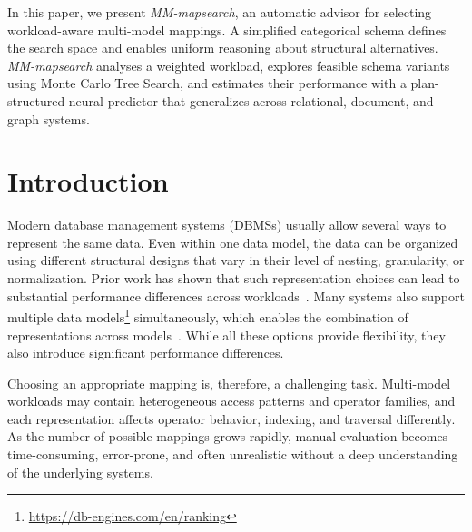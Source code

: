 In this paper, we present \textit{MM-mapsearch}, an automatic advisor for selecting workload-aware multi-model mappings. A simplified categorical schema defines the search space and enables uniform reasoning about structural alternatives. \textit{MM-mapsearch} analyses a weighted workload, explores feasible schema variants using Monte Carlo Tree Search, and estimates their performance with a plan-structured neural predictor that generalizes across relational, document, and graph systems.



\section{Introduction}
Modern database management systems (DBMSs) usually allow several ways to represent the same data. Even within one data model, the data can be organized using different structural designs that vary in their level of nesting, granularity, or normalization. Prior work has shown that such representation choices can lead to substantial performance differences across workloads~\citep{10.1145/3183713.3199671}. Many systems also support multiple data models\footnote{\url{https://db-engines.com/en/ranking}} simultaneously, which enables the combination of representations across models~\citep{CSUR-Jiaheng}. While all these options provide flexibility, they also introduce significant performance differences. 

Choosing an appropriate mapping is, therefore, a challenging task. Multi-model workloads may contain heterogeneous access patterns and operator families, and each representation affects operator behavior, indexing, and traversal differently. As the number of possible mappings grows rapidly, manual evaluation becomes time-consuming, error-prone, and often unrealistic without a deep understanding of the underlying systems.

